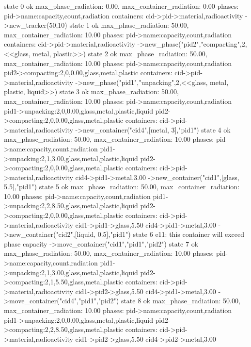 \begin{code}
  state 0 ok
  max_phase_radiation: 0.00, max_container_radiation: 0.00
  phases: pid->name:capacity,count,radiation
  containers: cid->pid->material,radioactivity
->new_tracker(50,10)
  state 1 ok
  max_phase_radiation: 50.00, max_container_radiation: 10.00
  phases: pid->name:capacity,count,radiation
  containers: cid->pid->material,radioactivity
->new_phase("pid2","compacting",2,<<glass, metal, plastic>>)
  state 2 ok
  max_phase_radiation: 50.00, max_container_radiation: 10.00
  phases: pid->name:capacity,count,radiation
    pid2->compacting:2,0,0.00,{glass,metal,plastic}
  containers: cid->pid->material,radioactivity
->new_phase("pid1","unpacking",2,<<glass, metal, plastic, liquid>>)
  state 3 ok
  max_phase_radiation: 50.00, max_container_radiation: 10.00
  phases: pid->name:capacity,count,radiation
    pid1->unpacking:2,0,0.00,{glass,metal,plastic,liquid}
    pid2->compacting:2,0,0.00,{glass,metal,plastic}
  containers: cid->pid->material,radioactivity
->new_container("cid4",[metal, 3],"pid1")
  state 4 ok
  max_phase_radiation: 50.00, max_container_radiation: 10.00
  phases: pid->name:capacity,count,radiation
    pid1->unpacking:2,1,3.00,{glass,metal,plastic,liquid}
    pid2->compacting:2,0,0.00,{glass,metal,plastic}
  containers: cid->pid->material,radioactivity
    cid4->pid1->metal,3.00
->new_container("cid1",[glass, 5.5],"pid1")
  state 5 ok
  max_phase_radiation: 50.00, max_container_radiation: 10.00
  phases: pid->name:capacity,count,radiation
    pid1->unpacking:2,2,8.50,{glass,metal,plastic,liquid}
    pid2->compacting:2,0,0.00,{glass,metal,plastic}
  containers: cid->pid->material,radioactivity
    cid1->pid1->glass,5.50
    cid4->pid1->metal,3.00
->new_container("cid2",[liquid, 0.5],"pid1")
  state 6 e11: this container will exceed phase capacity
->move_container("cid1","pid1","pid2")
  state 7 ok
  max_phase_radiation: 50.00, max_container_radiation: 10.00
  phases: pid->name:capacity,count,radiation
    pid1->unpacking:2,1,3.00,{glass,metal,plastic,liquid}
    pid2->compacting:2,1,5.50,{glass,metal,plastic}
  containers: cid->pid->material,radioactivity
    cid1->pid2->glass,5.50
    cid4->pid1->metal,3.00
->move_container("cid4","pid1","pid2")
  state 8 ok
  max_phase_radiation: 50.00, max_container_radiation: 10.00
  phases: pid->name:capacity,count,radiation
    pid1->unpacking:2,0,0.00,{glass,metal,plastic,liquid}
    pid2->compacting:2,2,8.50,{glass,metal,plastic}
  containers: cid->pid->material,radioactivity
    cid1->pid2->glass,5.50
    cid4->pid2->metal,3.00
\end{code}

